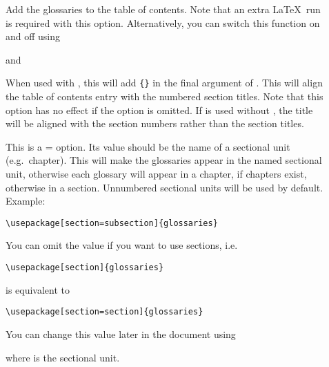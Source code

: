 \documentclass[report,inlinetitle]{nlctdoc}
\begin{document}
\begin{description}
\item[] Add the glossaries to the table of contents.
Note that an extra \LaTeX\ run is required with this option.
Alternatively, you can switch this function on and off using
\begin{definition}[\DescribeMacro{\glstoctrue}]
\end{definition}
and
\begin{definition}[\DescribeMacro{\glstocfalse}]
\end{definition}

\item[] When used with , this will
add \verb|{}| in the final argument of 
. This will align the table of contents entry 
with the numbered section titles. Note that this option has no
effect if the  option is omitted. If  is
used without , the title will be aligned with
the section numbers rather than the section titles.

\item[] This is a = option.  Its
value should be the name of a sectional unit (e.g.\ chapter).
This will make the glossaries appear in the named sectional unit,
otherwise each glossary will appear in a chapter, if chapters
exist, otherwise in a section. Unnumbered sectional units will be used
by default. Example:
\begin{verbatim}
\usepackage[section=subsection]{glossaries}
\end{verbatim}
You can omit the value if you want to use sections, i.e.\
\begin{verbatim}
\usepackage[section]{glossaries}
\end{verbatim}
is equivalent to
\begin{verbatim}
\usepackage[section=section]{glossaries}
\end{verbatim}
You can change this value later in the document using
\begin{definition}[\DescribeMacro{\setglossarysection}]
\end{definition}
where  is the sectional unit.


\end{description}
\end{document}
